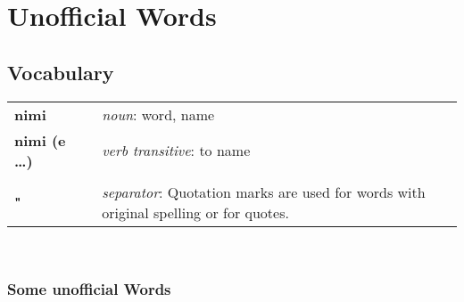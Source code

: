 \section{Unofficial Words} 
%
\subsection*{Vocabulary}
%
\begin{supertabular}{p{2,5cm}|ll}
\textbf{nimi} && \textit{noun}: word, name \\ %
\textbf{nimi (e \dots )} && \textit{verb transitive}: to name \\ %
 && \\ %
\textbf{"} && \textit{separator}: Quotation marks are used for words with original spelling or for quotes. \\ %
\end{supertabular} \\

\subsubsection*{Some unofficial Words}

